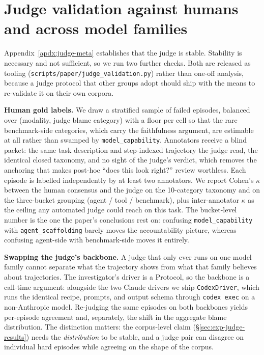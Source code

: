\documentclass{article}
\newcommand{\mypar}[1]{\par\noindent\textbf{#1}\enspace}
\begin{document}
\section{Judge validation against humans and across model families}
\label{apdx:judge-human}

Appendix~\ref{apdx:judge-meta} establishes that the judge is stable. Stability
is necessary and not sufficient, so we run two further checks. Both are
released as tooling (\texttt{scripts/paper/judge\_validation.py}) rather than
one-off analysis, because a judge protocol that other groups adopt should ship
with the means to re-validate it on their own corpora.

\mypar{Human gold labels.}
We draw a stratified sample of failed episodes, balanced over
(modality, judge blame category) with a floor per cell so that the rare
benchmark-side categories, which carry the faithfulness argument, are estimable
at all rather than swamped by \texttt{model\_capability}. Annotators receive a
blind packet: the same task description and step-indexed trajectory the judge
read, the identical closed taxonomy, and no sight of the judge's verdict, which
removes the anchoring that makes post-hoc ``does this look right?'' review
worthless. Each episode is labelled independently by at least two annotators.
We report Cohen's $\kappa$ between the human consensus and the judge on the
10-category taxonomy and on the three-bucket grouping
(agent / tool / benchmark), plus inter-annotator $\kappa$ as the ceiling any
automated judge could reach on this task. The bucket-level number is the one
the paper's conclusions rest on: confusing \texttt{model\_capability} with
\texttt{agent\_scaffolding} barely moves the accountability picture, whereas
confusing agent-side with benchmark-side moves it entirely.

\mypar{Swapping the judge's backbone.}
A judge that only ever runs on one model family cannot separate what the
trajectory shows from what that family believes about trajectories. The
investigator's driver is a Protocol, so the backbone is a call-time argument:
alongside the two Claude drivers we ship \texttt{CodexDriver}, which runs the
identical recipe, prompts, and output schema through \texttt{codex exec} on a
non-Anthropic model. Re-judging the same episodes on both backbones yields
per-episode agreement and, separately, the shift in the aggregate blame
distribution. The distinction matters: the corpus-level claim
(\S\ref{sec:exp-judge-results}) needs the \emph{distribution} to be stable, and
a judge pair can disagree on individual hard episodes while agreeing on the
shape of the corpus.
\end{document}

